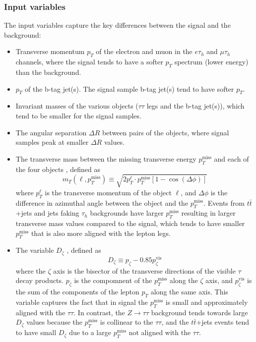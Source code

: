 \subsubsection{Input variables}
The input variables capture the key differences between the signal and the background:
\begin{itemize}
    \item Transverse momentum $p_{T}$ of the electron and muon in the $e\tau_{h}$ and $\mu\tau_{h}$ channels, where the signal tends to have a softer $p_{T}$ spectrum (lower energy) than the background.
    \item $p_{T}$ of the b-tag jet(s). The signal sample b-tag jet(s) tend to have softer $p_{T}$.
    \item Invariant masses of the various objects ($\tau\tau$ legs and the b-tag jet(s)), which tend to be smaller for the signal samples.
    \item The angular separation $\Delta R$ between pairs of the objects, where signal samples peak at smaller $\Delta R$ values.
    
    \item The transverse mass between the missing transverse energy $p_{T}^{\text{miss}}$ and each of the four objects \cite{CMS-HIG-17-024}, defined as
        \begin{equation}
            m_{T}(\ell, p_{T}^{\text{miss}}) \equiv \sqrt{2 p_{T}^{\ell} \cdot p_{T}^{\text{miss}} [1 - \cos(\Delta \phi)]}
        \end{equation}
    where $p_{T}^\ell$ is the transverse momentum of the object $\ell$, and $\Delta \phi$ is the difference in azimuthal angle between the object and the $p_{T}^{\text{miss}}$. Events from $t\bar{t}$+jets and jets faking $\tau_{h}$ backgrounds have larger $p_{T}^{\text{miss}}$ resulting in larger transverse mass values compared to the signal, which tends to have smaller $p_{T}^{\text{miss}}$ that is also more aligned with the lepton legs.

    \item The variable $D_{\zeta}$ \cite{CMS-HIG-17-024}, defined as
        \begin{equation}
            D_{\zeta} \equiv p_{\zeta} - 0.85 p_{\zeta}^{\text{vis}}
        \end{equation}
        where the $\zeta$ axis is the bisector of the transverse directions of the visible $\tau$ decay products. $p_{\zeta}$ is the compomnent of the $p_{T}^{\text{miss}}$ along the $\zeta$ axis, and $p_{\zeta}^{\text{vis}}$ is the sum of the components of the lepton $p_{T}$ along the same axis. This variable captures the fact that in signal the $p_{T}^\text{miss}$ is small and approximately aligned with the $\tau\tau$. In contrast, the $Z \rightarrow \tau\tau$ background tends towards large $D_{\zeta}$ values because the $p_{T}^{\text{miss}}$ is collinear to the $\tau\tau$, and the $t\bar{t}$+jets events tend to have small $D_{\zeta}$ due to a large $p_{T}^{\text{miss}}$ not aligned with the $\tau\tau$.


\end{itemize}

